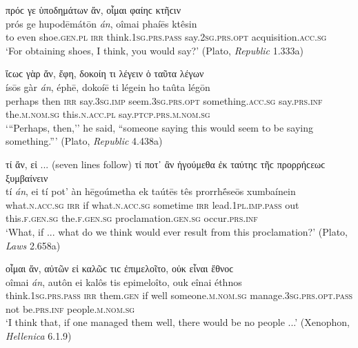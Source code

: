 \begin{exe}
\ex πρόϲ γε ὑποδημάτων ἄν, οἶμαι φαίηϲ κτῆϲιν\\
\gll prós ge hupodēmátōn \emph{án}, oîmai phaíēs ktêsin\\
to even shoe.\textsc{gen.pl} \textsc{irr} think.\textsc{1sg.prs.pass} say.\textsc{2sg.prs.opt} acquisition.\textsc{acc.sg}\\
\trans `For obtaining shoes, I think, you would say?' (Plato, \textit{Republic} 1.333a)
\label{clausean5}
\end{exe}

\begin{exe}
\ex ἴϲωϲ γὰρ ἄν, ἔφη, δοκοίη τι λέγειν ὁ ταῦτα λέγων\\
\gll ísōs gàr \emph{án}, éphē, dokoíē ti légein ho taûta légōn\\
perhaps then \textsc{irr} say.\textsc{3sg.imp} seem.\textsc{3sg.prs.opt} something.\textsc{acc.sg} say.\textsc{prs.inf} the.\textsc{m.nom.sg} this.\textsc{n.acc.pl} say.\textsc{ptcp.prs.m.nom.sg}\\
\trans `{``}Perhaps, then,'' he said, ``someone saying this would seem to be saying something.''' (Plato, \textit{Republic} 4.438a)
\label{clausean6}
\end{exe}

\begin{exe}
\ex τί ἄν, εἰ ... (seven lines follow) τί ποτ᾽ ἂν ἡγούμεθα ἐκ ταύτηϲ τῆϲ προρρήϲεωϲ ξυμβαίνειν\\
\gll tí \emph{án}, ei tí pot' àn hēgoúmetha ek taútēs tês prorrhḗseōs xumbaínein\\
what.\textsc{n.acc.sg} \textsc{irr} if what.\textsc{n.acc.sg} sometime \textsc{irr} lead.\textsc{1pl.imp.pass} out this.\textsc{f.gen.sg} the.\textsc{f.gen.sg} proclamation.\textsc{gen.sg} occur.\textsc{prs.inf}\\
\trans `What, if ... what do we think would ever result from this proclamation?' (Plato, \textit{Laws} 2.658a)
\label{clausean7}
\end{exe}

\begin{exe}
\ex οἶμαι ἄν, αὐτῶν εἰ καλῶϲ τιϲ ἐπιμελοῖτο, οὐκ εἶναι ἔθνοϲ\\
\gll oîmai \emph{án}, autôn ei kalôs tis epimeloîto, ouk eînai éthnos\\
think.\textsc{1sg.prs.pass} \textsc{irr} them.\textsc{gen} if well someone.\textsc{m.nom.sg} manage.\textsc{3sg.prs.opt.pass} not be.\textsc{prs.inf} people.\textsc{m.nom.sg}\\
\trans `I think that, if one managed them well, there would be no people ...' (Xenophon, \textit{Hellenica} 6.1.9)
\label{clausean8}
\end{exe}

